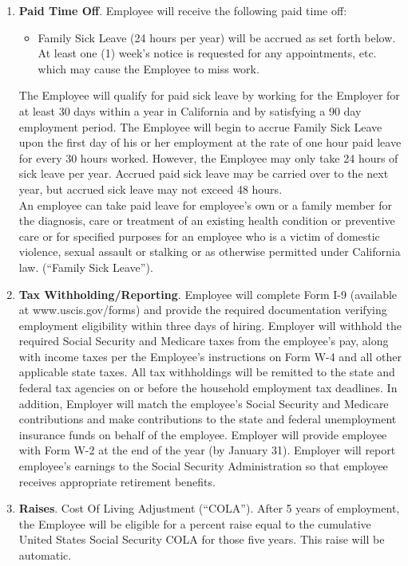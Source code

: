 \documentclass[]{article}
\begin{document}
\begin{enumerate}
	\item{\textbf{Paid Time Off}}. Employee will receive the following paid time off:
		\begin{itemize}
			\item Family Sick Leave (24 hours per year) will be accrued as set forth below. At least one (1) week's notice is requested for any appointments, etc. which may cause the Employee to miss work.
		\end{itemize} The Employee will qualify for paid sick leave by working for the Employer for at least 30 days within a year in California and by satisfying a 90 day employment period. The Employee will begin to accrue Family Sick Leave upon the first day of his or her employment at the rate of one hour paid leave for every 30 hours worked. However, the Employee may only take 24 hours of sick leave per year. Accrued paid sick leave may be carried over to the next year, but accrued sick leave may not exceed 48 hours.\\
	An employee can take paid leave for employee's own or a family member for the diagnosis, care or treatment of an existing health condition or preventive care or for specified purposes for an employee who is a victim of domestic violence, sexual assault or stalking or as otherwise permitted under California law. (``Family Sick Leave'').
	\item{\textbf{Tax Withholding/Reporting}}. Employee will complete Form I-9 (available at www.uscis.gov/forms) and provide the required documentation verifying employment eligibility within three days of hiring. Employer will withhold the required Social Security and Medicare taxes from the employee's pay, along with income taxes per the Employee's instructions on Form W-4 and all other applicable state taxes. All tax withholdings will be remitted to the state and federal tax agencies on or before the household employment tax deadlines. In addition, Employer will match the employee's Social Security and Medicare contributions and make contributions to the state and federal unemployment insurance funds on behalf of the employee. Employer will provide employee with Form W-2 at the end of the year (by January 31). Employer will report employee's earnings to the Social Security Administration so that employee receives appropriate retirement benefits.
	\item{\textbf{Raises}}. Cost Of Living Adjustment (``COLA''). After 5 years of employment, the Employee will be eligible for a percent raise equal to the cumulative United States Social Security COLA for those five years. This raise will be automatic.
\end{enumerate}
\end{document}

